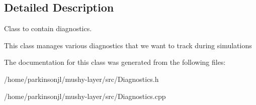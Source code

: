 \subsection{Detailed Description}
Class to contain diagnostics. 

This class manages various diagnostics that we want to track during simulations 

The documentation for this class was generated from the following files\-:\begin{DoxyCompactItemize}
\item 
/home/parkinsonjl/mushy-\/layer/src/Diagnostics.\-h\item 
/home/parkinsonjl/mushy-\/layer/src/Diagnostics.\-cpp\end{DoxyCompactItemize}
